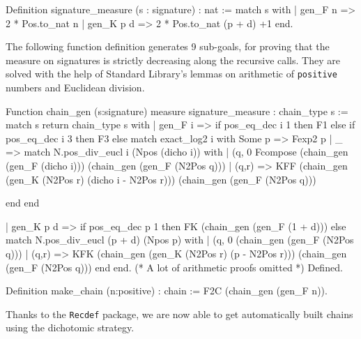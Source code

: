 \begin{Coqsrc}
Definition signature_measure (s : signature) : nat :=
match s with
  | gen_F n => 2 * Pos.to_nat n 
  | gen_K p d => 2 * Pos.to_nat (p + d) +1
end.
\end{Coqsrc}


The following function definition generates 9 sub-goals,
for proving that the measure on signatures is strictly decreasing along
the recursive calls. They are solved with the help of Standard Library's lemmas 
on arithmetic of \texttt{positive} numbers and Euclidean division.




\begin{Coqsrc}
Function chain_gen  (s:signature) {measure signature_measure}
:  chain_type s :=
  match s  return chain_type s with
    | gen_F i =>
      if pos_eq_dec i 1 then F1 else
        if pos_eq_dec i 3
        then F3
        else 
          match exact_log2 i with
              Some p => Fexp2 p
            | _ =>
              match N.pos_div_eucl i (Npos (dicho i))
              with
                | (q, 0%
                  Fcompose  (chain_gen (gen_F (dicho i)))
                            (chain_gen (gen_F (N2Pos q)))
                | (q,r)  => KFF (chain_gen
                                   (gen_K (N2Pos r)
                                          (dicho i - N2Pos r)))
                                (chain_gen (gen_F (N2Pos q)))
                                
              end end
\end{Coqsrc}

\begin{Coqsrc}
    | gen_K p d =>
      if pos_eq_dec p 1 then FK (chain_gen (gen_F (1 + d)))
      else
        match N.pos_div_eucl (p + d)  (Npos p) with
          | (q, 0%
                              (chain_gen (gen_F (N2Pos q)))
          | (q,r)  => KFK (chain_gen (gen_K (N2Pos r)
                                            (p - N2Pos r)))
                          (chain_gen (gen_F (N2Pos q)))
        end
  end.
(* A lot of arithmetic proofs omitted *)
Defined.

Definition make_chain (n:positive) : chain :=
 F2C (chain_gen (gen_F n)).

\end{Coqsrc}

Thanks to the \texttt{Recdef} package, we are now able to get automatically 
built chains using the dichotomic strategy.


